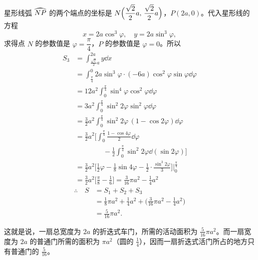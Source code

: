 星形线弧 $\arc{NP}$ 的两个端点的坐标是 $N\Bigl(\dfrac{\sqrt{2}}{2}a,\, \dfrac{\sqrt{2}}{2}a\Bigr)$，$P(2a, 0)$。代入星形线的方程
\[
  x = 2a\cos^3\varphi,\quad y = 2a\sin^3\varphi,
\]
求得点 $N$ 的参数值是 $\varphi = \dfrac{\pi}{4}$，$P$ 的参数值是 $\varphi = 0$。所以
\begin{align*}
  S_3 &= \int_{\frac{\sqrt{2}}{2}a}^{2a} y\dd x \\
      &= \int_{\frac{\pi}{4}}^{0} 2a\sin^3\varphi \cdot (-6a)\cos^2\varphi\sin\varphi\dd\varphi \\
      &= 12a^2\int_{0}^{\frac{\pi}{4}} \sin^4\varphi\cos^2\varphi\dd\varphi \\
      &= 3a^2\int_{0}^{\frac{\pi}{4}} \sin^2 2\varphi \sin^2\varphi\dd\varphi \\
      &= \frac{3}{2}a^2\int_{0}^{\frac{\pi}{4}} \sin^2 2\varphi\,(1-\cos 2\varphi)\dd\varphi \\
      &= \frac{3}{2}a^2\biggl[\int_{0}^{\frac{\pi}{4}} \frac{1-\cos 4\varphi}{2}\dd\varphi \\
      &\qquad\qquad - \frac{1}{2}\int_{0}^{\frac{\pi}{4}} \sin^2 2\varphi\dd(\sin 2\varphi)\biggr] \\
      &= \frac{3}{2}a^2\biggl[\frac{1}{2}\varphi - \frac{1}{8}\sin 4\varphi
         - \frac{1}{2}\cdot\frac{\sin^3 2\varphi}{3}\biggr]\biggr|_{0}^{\frac{\pi}{4}} \\
      &= \frac{3}{2}a^2\biggl[\frac{\pi}{8} - \frac{1}{6}\biggr]
       = \frac{3}{16}\pi a^2 - \frac{1}{4}a^2
\end{align*}
\begin{align*}
  \therefore\quad S &= S_1 + S_2 + S_3 \\
                    &= \frac{1}{8}\pi a^2 + \frac{1}{4}a^2 + \biggl(\frac{3}{16}\pi a^2 - \frac{1}{4}a^2\biggr) \\
                    &= \frac{5}{16}\pi a^2.
\end{align*}

这就是说，一扇总宽度为 $2a$ 的折迭式车门，所需的活动面积为 $\frac{5}{16}\pi a^2$。而一扇宽度为 $2a$ 的普通门所需的面积为 $\pi a^2$（圆的 $\frac{1}{4}$），因而一扇折迭式活门所占的地方只有普通门的 $\frac{5}{16}$。
